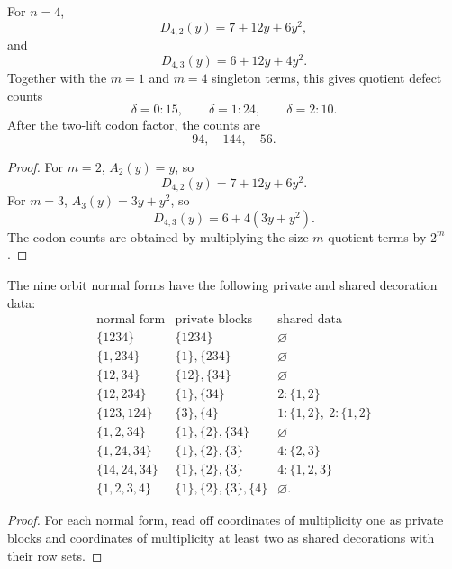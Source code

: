 \begin{corollary}
\label{cor:philosophy-codon-defect-polynomials}
For $n=4$,
$$
  D_{4,2}(y)=7+12y+6y^{2},
$$
and
$$
  D_{4,3}(y)=6+12y+4y^{2}.
$$
Together with the $m=1$ and $m=4$ singleton terms, this gives quotient
defect counts
$$
  \delta=0:15,
  \qquad
  \delta=1:24,
  \qquad
  \delta=2:10.
$$
After the two-lift codon factor, the counts are
$$
  94,\quad144,\quad56.
$$
\end{corollary}
\begin{proof}
For $m=2$, $A_{2}(y)=y$, so
$$
  D_{4,2}(y)=7+12y+6y^{2}.
$$
For $m=3$, $A_{3}(y)=3y+y^{2}$, so
$$
  D_{4,3}(y)=6+4(3y+y^{2}).
$$
The codon counts are obtained by multiplying the size-$m$ quotient
terms by $2^{m}$.
\end{proof}

\begin{corollary}
\label{cor:philosophy-orbit-decoration-table}
The nine orbit normal forms have the following private and shared
decoration data:
$$
\begin{array}{c|c|c}
  \text{normal form} & \text{private blocks} & \text{shared data}\\
  \hline
  \{1234\} & \{1234\} & \varnothing\\
  \{1,234\} & \{1\},\{234\} & \varnothing\\
  \{12,34\} & \{12\},\{34\} & \varnothing\\
  \{12,234\} & \{1\},\{34\} & 2:\{1,2\}\\
  \{123,124\} & \{3\},\{4\} & 1:\{1,2\},\ 2:\{1,2\}\\
  \{1,2,34\} & \{1\},\{2\},\{34\} & \varnothing\\
  \{1,24,34\} & \{1\},\{2\},\{3\} & 4:\{2,3\}\\
  \{14,24,34\} & \{1\},\{2\},\{3\} & 4:\{1,2,3\}\\
  \{1,2,3,4\} & \{1\},\{2\},\{3\},\{4\} & \varnothing.
\end{array}
$$
\end{corollary}
\begin{proof}
For each normal form, read off coordinates of multiplicity one as
private blocks and coordinates of multiplicity at least two as shared
decorations with their row sets.
\end{proof}

